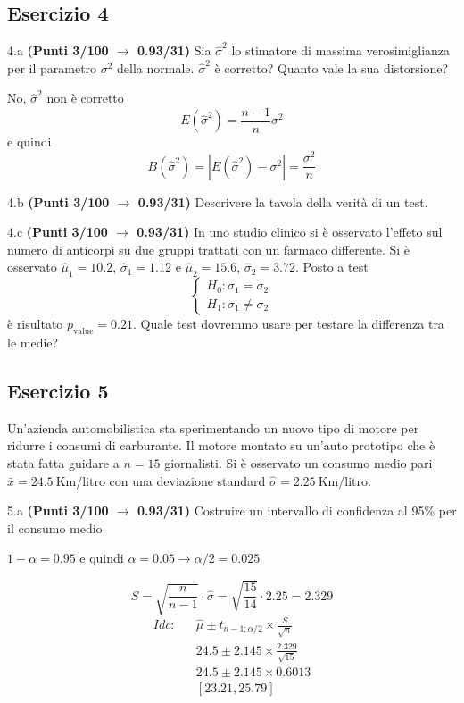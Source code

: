 \documentclass[
  11pt,
]{book}
\theoremstyle{mytheoremstyle}
\theoremstyle{mydefstyle}
\newenvironment{sol}
  {
  \begin{tcolorbox}[enhanced,breakable,arc=0.1mm,boxrule=1pt,colback=white,colframe=iblue,
  title=\bf \fontfamily{lmss}\selectfont \hspace{.5 cm} Soluzione,drop fuzzy shadow]

}{
\end{tcolorbox}
  }
\begin{document}
\subsection{Esercizio 4}\label{esercizio-4-8}

4.a \textbf{(Punti 3/100 \(\rightarrow\) 0.93/31)} Sia \(\hat\sigma^2\) lo stimatore di massima verosimiglianza per il parametro \(\sigma^2\) della normale. \(\hat\sigma^2\) è corretto? Quanto vale la sua distorsione?

\begin{sol}
No, \(\hat\sigma^2\) non è corretto
\[
E(\hat\sigma^2)=\frac{n-1}n\sigma^2
\]
e quindi
\[
B(\hat\sigma^2)=|E(\hat\sigma^2)-\sigma^2|=\frac {\sigma^2}n
\]

\end{sol}

4.b \textbf{(Punti 3/100 \(\rightarrow\) 0.93/31)} Descrivere la tavola della verità di un test.

4.c \textbf{(Punti 3/100 \(\rightarrow\) 0.93/31)} In uno studio clinico si è osservato l'effeto sul numero di anticorpi su due gruppi trattati con un farmaco differente. Si è osservato \(\hat\mu_1=10.2\), \(\hat\sigma_1=1.12\) e \(\hat\mu_2=15.6\), \(\hat\sigma_2=3.72\). Posto a test
\[
\begin{cases}
H_0:\sigma_1=\sigma_2\\
H_1:\sigma_1\ne \sigma_2
\end{cases}
\]
è risultato \(p_\text{value}=0.21\). Quale test dovremmo usare per testare la differenza tra le medie?

\subsection{Esercizio 5}\label{esercizio-5-6}

Un'azienda automobilistica sta sperimentando un nuovo tipo di motore per ridurre i consumi di carburante. Il motore montato su un'auto prototipo che è stata fatta guidare a \(n=15\) giornalisti. Si è osservato un consumo medio pari \(\bar x=24.5~\text{Km/litro}\) con una deviazione standard \(\hat\sigma=2.25~\text{Km/litro}\).

5.a \textbf{(Punti 3/100 \(\rightarrow\) 0.93/31)} Costruire un intervallo di confidenza al 95\% per il consumo medio.

\begin{sol}
\(1-\alpha =0.95\) e quindi \(\alpha=0.05\rightarrow \alpha/2=0.025\)

\[
      S  =\sqrt{\frac {n}{n-1}}\cdot\hat\sigma =
     \sqrt{\frac { 15 }{ 14 }}\cdot 2.25 = 2.329 
\]
\begin{eqnarray*}
  Idc: & &  \hat\mu \pm  t_{n-1;\alpha/2} \times \frac{S}{\sqrt{n}} \\
     & &  24.5 \pm  2.145 \times \frac{ 2.329 }{\sqrt{ 15 }} \\
     & &  24.5 \pm  2.145 \times  0.6013 \\
     & & [ 23.21 ,  25.79 ]
\end{eqnarray*}

\end{sol}
\end{document}
